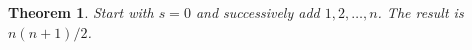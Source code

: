 \documentclass{article}
\newtheorem{theorem}{Theorem}
\begin{document}
\begin{theorem}\label{thm:G02}
Start with $s=0$ and successively add $1,2,\dots,n$. The result is $n(n+1)/2$.
\end{theorem}
\end{document}
